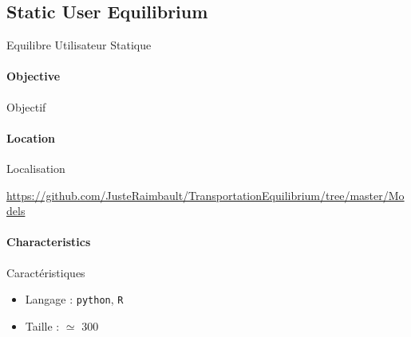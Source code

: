 





\subsection{Static User Equilibrium}{Equilibre Utilisateur Statique}

\paragraph{Objective}{Objectif}


\paragraph{Location}{Localisation}

\url{https://github.com/JusteRaimbault/TransportationEquilibrium/tree/master/Models}

\paragraph{Characteristics}{Caractéristiques}

\begin{itemize}
\item Langage : \texttt{python}, \texttt{R}
\item Taille : $\simeq$ 300
\end{itemize}









